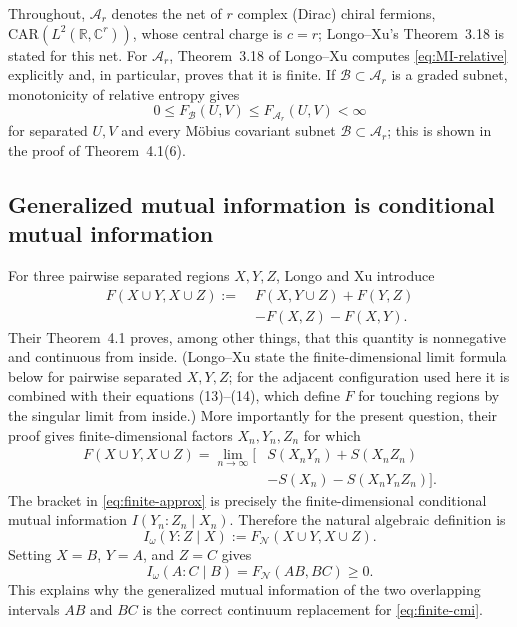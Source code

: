 \documentclass[11pt]{article}
\theoremstyle{accenttheorem}
\theoremstyle{definition}
\newcommand{\cB}{\mathcal{B}}
\newcommand{\cN}{\mathcal{N}}
\newcommand{\Ar}{\mathcal{A}_{r}}
\newcommand{\MI}{F}
\newcommand{\CMI}{I_{\omega}}
\newcommand{\1}{\mathbf{1}}
\begin{document}
Throughout, \(\Ar\) denotes the net of \(r\) complex (Dirac) chiral fermions, \(\mathrm{CAR}(L^2(\mathbb R,\mathbb C^r))\), whose central charge is \(c=r\); Longo--Xu's Theorem~3.18 is stated for this net.  For \(\Ar\), Theorem~3.18 of Longo--Xu computes \eqref{eq:MI-relative} explicitly and, in particular, proves that it is finite.  If \(\cB\subset\Ar\) is a graded subnet, monotonicity of relative entropy gives
\begin{equation}\label{eq:subnet-bound}
 0\le \MI_{\cB}(U,V)\le \MI_{\Ar}(U,V)<\infty
\end{equation}
for separated \(U,V\) and every M\"obius covariant subnet \(\cB\subset\Ar\); this is shown in the proof of Theorem~4.1(6).

\subsection{Generalized mutual information is conditional mutual information}

For three pairwise separated regions \(X,Y,Z\), Longo and Xu introduce
\begin{equation}\label{eq:generalized-F}
\begin{split}
 \MI(X\cup Y,X\cup Z)
 :=\;&\MI(X,Y\cup Z)+\MI(Y,Z)\\
    &-\MI(X,Z)-\MI(X,Y).
\end{split}
\end{equation}
Their Theorem~4.1 proves, among other things, that this quantity is nonnegative and continuous from inside.  (Longo--Xu state the finite-dimensional limit formula below for pairwise separated \(X,Y,Z\); for the adjacent configuration used here it is combined with their equations (13)--(14), which define \(F\) for touching regions by the singular limit from inside.)  More importantly for the present question, their proof gives finite-dimensional factors \(X_n,Y_n,Z_n\) for which
\begin{equation}\label{eq:finite-approx}
\begin{split}
 \MI(X\cup Y,X\cup Z)
 =\lim_{n\to\infty}\big[&S(X_nY_n)+S(X_nZ_n)\\
                         &-S(X_n)-S(X_nY_nZ_n)\big].
\end{split}
\end{equation}
The bracket in \eqref{eq:finite-approx} is precisely the finite-dimensional conditional mutual information \(I(Y_n:Z_n\mid X_n)\).  Therefore the natural algebraic definition is
\begin{equation}\label{eq:cmi-as-F}
 \CMI(Y:Z\mid X):=\MI_{\cN}(X\cup Y,X\cup Z).
\end{equation}
Setting \(X=B\), \(Y=A\), and \(Z=C\) gives
\begin{equation}\label{eq:our-cmi}
 \CMI(A:C\mid B)=\MI_{\cN}(AB,BC)\ge 0.
\end{equation}
This explains why the generalized mutual information of the two overlapping intervals \(AB\) and \(BC\) is the correct continuum replacement for \eqref{eq:finite-cmi}.
\end{document}
